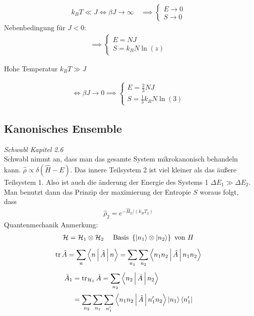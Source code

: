 \begin{description}
\begin{align*}
      k_B T \ll J \iff \beta J \longrightarrow \infty \quad \implies \begin{cases}
        E \longrightarrow 0 \\ S \longrightarrow 0
      \end{cases}
    \end{align*}
    Nebenbedingung f\"ur $J < 0$: 
    \begin{align*}
      \implies  \begin{cases}
        E = N J \\
        S = k_B N \ln{(z)}
      \end{cases}
    \end{align*}

    Hohe Temperatur $k_B T \gg J$

    \begin{align*}
      \iff \beta J \longrightarrow  0 \implies 
      \begin{cases}
        E = \frac{2}{3} N J \\
        S = \frac{1}{3} k_B N \ln{(3)}
      \end{cases}
    \end{align*}
\end{description}
\subsection*{Kanonisches Ensemble}
\emph{Schwabl Kapitel 2.6} \\
Schwabl nimmt an, dass man das gesamte System mikrokanonisch behandeln kann.
$\hat{\rho} \propto \delta (\hat{H} -E)$. Das innere Teilsystem 2 ist
viel kleiner als das \"au\ss{}ere Teilsystem 1. Also ist auch die \"anderung
der Energie des Systems 1 $\Delta E_1 \gg \Delta E_2$. Man benutzt dann
das Prinzip der maximierung der Entropie $S$ woraus folgt, dass
%
\begin{align*}
  \hat{\rho}_2 = e^{- \hat{H}_2 / (k_B T_2) }
\end{align*}
%
Quantenmechanik Anmerkung:
%
\begin{align*}
  \mathcal{H} = \mathcal{H}_1 \otimes \mathcal{ H}_2 && \text{ Basis } 
  \left\{ \Ket{n_1} \otimes \Ket{n_2} \right\} \text{ von } H
\end{align*}
%
\begin{align*}
  \operatorname{tr} \hat{A} = \sum_{n}^{} \Braket{n | \hat{ A} | n} = 
  \sum_{n_1}^{} \sum_{n_2}^{} \Braket{n_1 n_2 | \hat{A} | n_1 n_2} 
\end{align*}
%
%
\begin{align*}
  \hat{A}_1 & = \operatorname{tr}_{\mathcal{H}_1} \hat{A} = \sum_{n_2}^{} \Braket{n_2 | \hat{A} | n_2} \\
            & = \sum_{n_2}^{} \sum_{n_1}^{} \sum_{n_1'}^{} 
  \Braket{ n_1 n_2 | \hat{A} | n_1' n_2} \Ket{n_1} \Bra{n_1'}
\end{align*}
%

